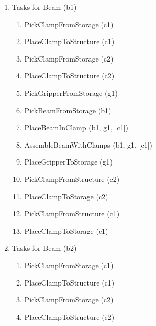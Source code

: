 \begin{enumerate}
	\item {\footnotesize Tasks for Beam (b1) }

\begin{enumerate}
	\item {\footnotesize PickClampFromStorage (c1)}

	\item {\footnotesize PlaceClampToStructure (c1)}

	\item {\footnotesize PickClampFromStorage (c2)}

	\item {\footnotesize PlaceClampToStructure (c2)}

	\item {\footnotesize PickGripperFromStorage (g1)}

	\item {\footnotesize PickBeamFromStorage (b1)}

	\item {\footnotesize PlaceBeamInClamp (b1, g1, [c1])}

	\item {\footnotesize AssembleBeamWithClamps (b1, g1, [c1])}

	\item {\footnotesize PlaceGripperToStorage (g1)}

	\item {\footnotesize PickClampFromStructure (c2)}

	\item {\footnotesize PlaceClampToStorage (c2)}

	\item {\footnotesize PickClampFromStructure (c1)}

	\item {\footnotesize PlaceClampToStorage (c1)}

\end{enumerate}
	\item {\footnotesize Tasks for Beam (b2) }

\begin{enumerate}
	\item {\footnotesize PickClampFromStorage (c1)}

	\item {\footnotesize PlaceClampToStructure (c1)}

	\item {\footnotesize PickClampFromStorage (c2)}

	\item {\footnotesize PlaceClampToStructure (c2)}


\end{enumerate}
\end{enumerate}
